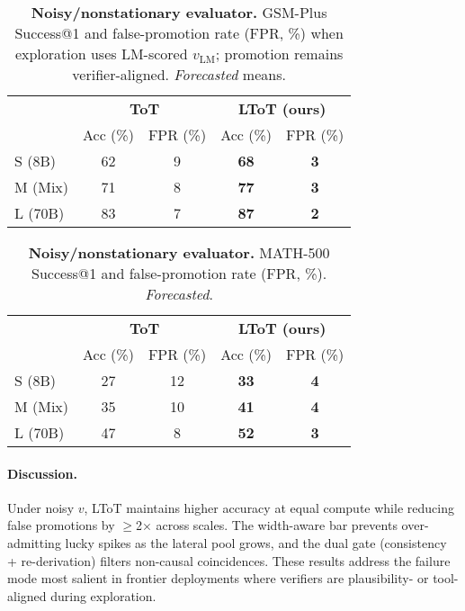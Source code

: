 \documentclass{article}
\begin{document}
\begin{table}[t]
\centering
\caption{\textbf{Noisy/nonstationary evaluator.} GSM-Plus Success@1 and false-promotion rate (FPR, \%) when exploration uses LM-scored $v_{\text{LM}}$; promotion remains verifier-aligned. \emph{Forecasted} means.}
\vspace{0.3em}
\begin{tabular}{lcccc}
\toprule
 & \multicolumn{2}{c}{\textbf{ToT}} & \multicolumn{2}{c}{\textbf{LToT (ours)}} \\
\cmidrule(lr){2-3}\cmidrule(lr){4-5}
 & Acc (\%) & FPR (\%) & Acc (\%) & FPR (\%) \\
\midrule
S (8B)  & 62 & 9  & \textbf{68} & \textbf{3} \\
M (Mix) & 71 & 8  & \textbf{77} & \textbf{3} \\
L (70B) & 83 & 7  & \textbf{87} & \textbf{2} \\
\bottomrule
\end{tabular}
\label{tab:noisy-gsm}
\end{table}

\begin{table}[t]
\centering
\caption{\textbf{Noisy/nonstationary evaluator.} MATH-500 Success@1 and false-promotion rate (FPR, \%). \emph{Forecasted}.}
\vspace{0.3em}
\begin{tabular}{lcccc}
\toprule
 & \multicolumn{2}{c}{\textbf{ToT}} & \multicolumn{2}{c}{\textbf{LToT (ours)}} \\
\cmidrule(lr){2-3}\cmidrule(lr){4-5}
 & Acc (\%) & FPR (\%) & Acc (\%) & FPR (\%) \\
\midrule
S (8B)  & 27 & 12 & \textbf{33} & \textbf{4} \\
M (Mix) & 35 & 10 & \textbf{41} & \textbf{4} \\
L (70B) & 47 &  8 & \textbf{52} & \textbf{3} \\
\bottomrule
\end{tabular}
\label{tab:noisy-math}
\end{table}

\paragraph{Discussion.}
Under noisy $v$, LToT maintains higher accuracy at equal compute while reducing false promotions by $\ge$2$\times$ across scales.
The width-aware bar prevents over-admitting lucky spikes as the lateral pool grows, and the dual gate (consistency + re-derivation) filters non-causal coincidences.
These results address the failure mode most salient in frontier deployments where verifiers are plausibility- or tool-aligned during exploration.
\end{document}
